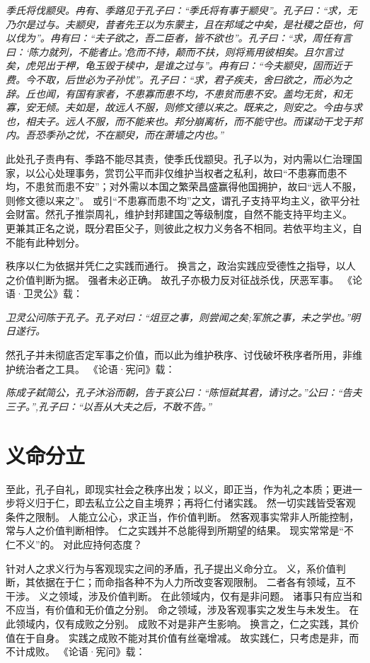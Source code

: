 \documentclass[11pt]{article}
\begin{document}
\textit{季氏将伐颛臾。冉有、季路见于孔子曰：“季氏将有事于颛臾”。孔子曰：“求，无乃尔是过与。夫颛臾，昔者先王以为东蒙主，且在邦域之中矣，是社稷之臣也，何以伐为”。冉有曰：“夫子欲之，吾二臣者，皆不欲也”。孔子曰：“求，周任有言曰：‘陈力就列，不能者止。’危而不持，颠而不扶，则将焉用彼相矣。且尔言过矣，虎兕出于柙，龟玉毁于椟中，是谁之过与”。冉有曰：“今夫颛臾，固而近于费。今不取，后世必为子孙忧”。孔子曰：“求，君子疾夫，舍曰欲之，而必为之辞。丘也闻，有国有家者，不患寡而患不均，不患贫而患不安。盖均无贫，和无寡，安无倾。夫如是，故远人不服，则修文德以来之。既来之，则安之。今由与求也，相夫子。远人不服，而不能来也。邦分崩离析，而不能守也。而谋动干戈于邦内。吾恐季孙之忧，不在颛臾，而在萧墙之内也。”}

此处孔子责冉有、季路不能尽其责，使季氏伐颛臾。孔子以为，对内需以仁治理国家，以公心处理事务，赏罚公平而非仅维护当权者之私利，故曰“不患寡而患不均，不患贫而患不安”；对外需以本国之繁荣昌盛赢得他国拥护，故曰“远人不服，则修文德以来之”。
或引“不患寡而患不均”之文，谓孔子支持平均主义，欲平分社会财富。然孔子推崇周礼，维护封邦建国之等级制度，自然不能支持平均主义。
更兼其正名之说，既分君臣父子，则彼此之权力义务各不相同。若依平均主义，自不能有此种划分。

\newline

秩序以仁为依据并凭仁之实践而通行。
换言之，政治实践应受德性之指导，以人之价值判断为据。
强者未必正确。
故孔子亦极力反对征战杀伐，厌恶军事。
《论语·卫灵公》载：

\textit{卫灵公问陈于孔子。孔子对曰：“俎豆之事，则尝闻之矣;军旅之事，未之学也。”明日遂行。}

然孔子并未彻底否定军事之价值，而以此为维护秩序、讨伐破坏秩序者所用，非维护统治者之工具。
《论语·宪问》载：

\textit{陈成子弑简公，孔子沐浴而朝，告于哀公曰：“陈恒弑其君，请讨之。”公曰：“告夫三子。”,孔子曰：“以吾从大夫之后，不敢不告。”}

\section{义命分立}
至此，孔子自礼，即现实社会之秩序出发；以义，即正当，作为礼之本质；更进一步将义归于仁，即去私立公之自主境界；再将仁付诸实践。
然一切实践皆受客观条件之限制。
人能立公心，求正当，作价值判断。
然客观事实常非人所能控制，常与人之价值判断相悖。
仁之实践并不总能得到所期望的结果。
现实常常是“不仁不义”的。
对此应持何态度？

\newline

针对人之求义行为与客观现实之间的矛盾，孔子提出义命分立。
义，系价值判断，其依据在于仁；而命指各种不为人力所改变客观限制。
二者各有领域，互不干涉。
义之领域，涉及价值判断。
在此领域内，仅有是非问题。
诸事只有应当和不应当，有价值和无价值之分别。
命之领域，涉及客观事实之发生与未发生。
在此领域内，仅有成败之分别。
成败不对是非产生影响。
换言之，仁之实践，其价值在于自身。
实践之成败不能对其价值有丝毫增减。
故实践仁，只考虑是非，而不计成败。
《论语·宪问》载：
\end{document}
